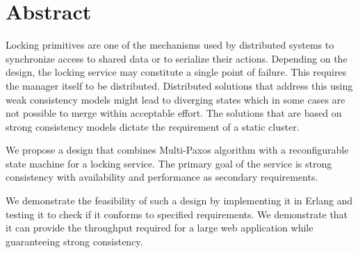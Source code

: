 \chapter{Abstract}

Locking primitives are one of the mechanisms used by distributed systems
to synchronize access to shared data or to serialize their actions. Depending
on the design, the locking service may constitute
a single point of failure. This requires the manager itself to be
distributed. Distributed solutions that address this using weak consistency
models might lead to diverging states which in some cases are not possible to
merge within acceptable effort. The solutions that are based on strong
consistency models dictate the requirement of a static cluster.

We propose a design that combines Multi-Paxos algorithm with a
reconfigurable state machine for a locking service. The primary goal of
the service is strong consistency with availability and performance as
secondary requirements.

We demonstrate the feasibility of such a design by implementing it
in Erlang and testing it to check if it conforms to specified requirements.
We demonstrate that it can provide the throughput required for a large
web application while guaranteeing strong consistency.
